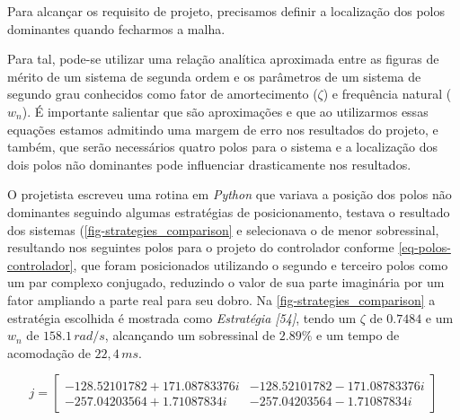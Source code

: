 \documentclass[
	12pt,				%
	article,			%
	openright,			%
	oneside,
	a4paper,			%
	chapter=TITLE,		%
	section=TITLE,		%
	english,			%
	french,				%
	spanish,			%
	brazil,				%
]{abntex2}
\begin{document}
\begin{figure}[htbp]
{
                }
            \end{figure}
            
            Para alcançar os requisito de projeto, precisamos definir a localização dos polos dominantes quando fecharmos a malha. 
            
            Para tal, pode-se utilizar uma relação analítica aproximada entre as figuras de mérito de um sistema de segunda ordem e os parâmetros de um sistema de segundo grau conhecidos como fator de amortecimento ($\zeta$) e frequência natural ($w_n$). É importante salientar que são aproximações e que ao utilizarmos essas equações estamos admitindo uma margem de erro nos resultados do projeto, e também, que serão necessários quatro polos para o sistema e a localização dos dois polos não dominantes pode influenciar drasticamente nos resultados.
            
            O projetista escreveu uma rotina em \textit{Python} que variava a posição dos polos não dominantes seguindo algumas estratégias de posicionamento, testava o resultado dos sistemas (\autoref{fig-strategies_comparison} e selecionava o de menor sobressinal, resultando nos seguintes polos para o projeto do controlador conforme \ref{eq-polos-controlador}, que foram posicionados utilizando o segundo e terceiro polos como um par complexo conjugado, reduzindo o valor de sua parte imaginária por um fator ampliando a parte real para seu dobro. Na \autoref{fig-strategies_comparison} a estratégia escolhida é mostrada como \textit{Estratégia [54]}, tendo um $ \zeta $ de $0.7484$ e um $w_n$ de $158.1\,rad/s$, alcançando um sobressinal de $2.89\%$ e um tempo de acomodação de $22,4\,ms$.
            
            \begin{equation}
                \label{eq-polos-controlador}
                j = \begin{bmatrix}
                    -128.52101782 +171.08783376i & -128.52101782 -171.08783376i \\
                    -257.04203564  +1.71087834i & -257.04203564  -1.71087834i
                    \end{bmatrix}
            \end{equation}
            
\end{document}

